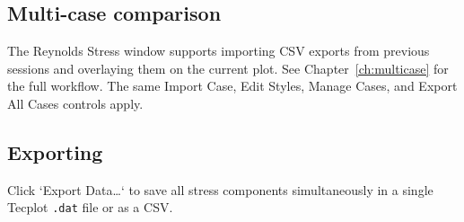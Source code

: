 \subsection{Multi-case comparison}

The Reynolds Stress window supports importing CSV exports from previous sessions and overlaying them on the current plot. See Chapter~\ref{ch:multicase} for the full workflow. The same Import Case, Edit Styles, Manage Cases, and Export All Cases controls apply.

\subsection{Exporting}

Click `Export Data\ldots` to save all stress components simultaneously in a single Tecplot \texttt{.dat} file or as a CSV.

